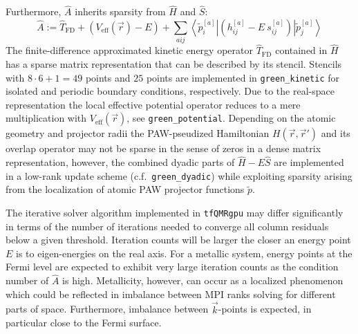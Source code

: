 \documentclass[oribibl]{llncs}
\newcommand{\um}[1]{_{\mathrm{#1}}}
\newcommand{\ttt}[1]{\texttt{#1}}
\newcommand{\braketop}[3]{\left\langle \left. #1 \right| #2 \left| #3 \right. \right\rangle}
\begin{document}
Furthermore, $\hat A$ inherits sparsity from $\hat H$ and $\hat S$:
\begin{equation}
	\hat A := \hat T\um{FD} + \left(V\um{eff}(\vec r) - E\right) + \sum_{aij} \braketop{\tilde p^{[a]}_i}{(h^{[a]}_{ij} - E\ s^{[a]}_{ij})}{\tilde p^{[a]}_j}
\end{equation}
The finite-difference approximated kinetic energy operator $\hat T\um{FD}$ contained in $\hat H$ 
has a sparse matrix representation that can be described by its stencil. 
Stencils with $8\cdot 6 + 1 = 49$ points and $25$ points are implemented in \ttt{green\_kinetic}
for isolated and periodic boundary conditions, respectively.
Due to the real-space representation the local effective potential operator reduces to a mere multiplication with $V\um{eff}(\vec r)$, see \ttt{green\_potential}.
Depending on the atomic geometry and projector radii the \ac{PAW}-pseudized Hamiltonian $H(\vec r,\vec r')$ and its overlap operator may not be sparse in the sense of zeros in a dense matrix representation,
however, the combined dyadic parts of $\hat H - E\hat S$ are implemented in a low-rank update scheme (c.f.~\ttt{green\_dyadic}) while exploiting sparsity arising from the localization of atomic \ac{PAW} projector functions $\tilde p$.

\noindent
The iterative solver algorithm implemented in \ttt{tfQMRgpu} may differ significantly in terms of the number of iterations needed to converge all column residuals below a given threshold. Iteration counts will be larger the closer an energy point $E$ is to eigen-energies on the real axis. For a metallic system, energy points at the Fermi level are expected to exhibit very large iteration counts as the condition number of $\hat A$ is high. Metallicity, however, can occur as a localized phenomenon which could be reflected in imbalance between \ac{MPI} ranks solving for different parts of space.
Furthermore, imbalance between $\vec k$-points is expected, in particular close to the Fermi surface.
\end{document}
